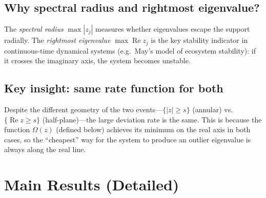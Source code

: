 \documentclass[11pt,a4paper]{article}
\theoremstyle{definition}
\theoremstyle{remark}
\begin{document}
\subsection*{Why spectral radius and rightmost eigenvalue?}

The \emph{spectral radius} $\max|z_j|$ measures whether eigenvalues escape the support radially.  The \emph{rightmost eigenvalue} $\max\operatorname{Re} z_j$ is the key stability indicator in continuous-time dynamical systems (e.g.\ May's model of ecosystem stability): if it crosses the imaginary axis, the system becomes unstable.

\subsection*{Key insight: same rate function for both}

Despite the different geometry of the two events---$\{|z|\ge s\}$ (annular) vs.\ $\{\operatorname{Re} z\ge s\}$ (half-plane)---the large deviation rate is the same.  This is because the function $\Omega(z)$ (defined below) achieves its minimum on the real axis in both cases, so the ``cheapest'' way for the system to produce an outlier eigenvalue is always along the real line.

\section{Main Results (Detailed)}
\end{document}
